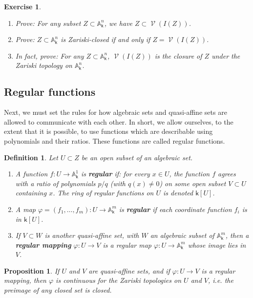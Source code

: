 \documentclass[11pt]{article}
\newcommand{\A}{\mathbb{A}}
\renewcommand{\k}{\mathsf{k}}
\renewcommand{\to}{\longrightarrow}
\DeclareMathOperator{\V}{\mathcal{V}}
\newcommand{\A}{\mathbb A}
\renewcommand{\k}{\mathsf{k}}
\renewcommand{\to}{{\longrightarrow}}
\newtheorem{proposition}{Proposition}[section]
\newtheorem{definition}{Definition}[section]
\newtheorem{exercise}{Exercise}[section]
\begin{document}
\begin{exercise}
\begin{enumerate}
\item Prove: For any subset \(Z \subset \A^{n}_{\k}\), we have \(Z \subset \V(I(Z))\).
\item Prove:  \(Z \subset \A^n_{\k}\) is Zariski-closed if and only if \(Z = \V(I(Z))\).
\item In fact, prove: For any \(Z \subset \A^n_{\k}\), \(\V(I(Z))\) is the closure of \(Z\) under the Zariski topology on \(\A^n_{\k}\).
\end{enumerate}
\end{exercise}

\subsection{Regular functions}
\label{sec:orgedd0624}

Next, we must set the rules for how algebraic sets and quasi-affine sets are allowed to communicate with each other. In short, we allow ourselves, to the extent that it is possible, to use functions which are describable using polynomials and their ratios.  These functions are called regular functions.

\begin{definition}
Let \(U \subset Z\) be an open subset of an algebraic set.
\begin{enumerate}
\item A function \(f: U \to \A^1_{\k}\) is \textbf{\emph{regular}} if: for every \(x \in U\), the function \(f\) agrees with a ratio of polynomials \(p/q\) (with \(q(x) \neq 0\)) on some open subset \(V \subset U\) containing \(x\). The ring of regular functions on \(U\) is denoted \(\k[U]\).
\item A map \(\varphi = (f_1, \dots, f_m): U \to \A^m_{\k}\) is \textbf{\emph{regular}} if each coordinate function \(f_i\) is in \(\k[U]\).
\item If \(V \subset W\) is another quasi-affine set, with \(W\) an algebraic subset of \(\A^m_{\k}\), then a \textbf{\emph{regular mapping}} \(\varphi: U \to V\) is a regular map \(\varphi: U \to \A^m_{\k}\) whose image lies in \(V\).
\end{enumerate}
\end{definition}

\begin{proposition}
If \(U\) and \(V\) are quasi-affine sets, and if \(\varphi: U \to V\) is a regular mapping, then \(\varphi\) is continuous for the Zariski topologies on \(U\) and \(V\), i.e. the preimage of any closed set is closed.
\end{proposition}
\end{document}
